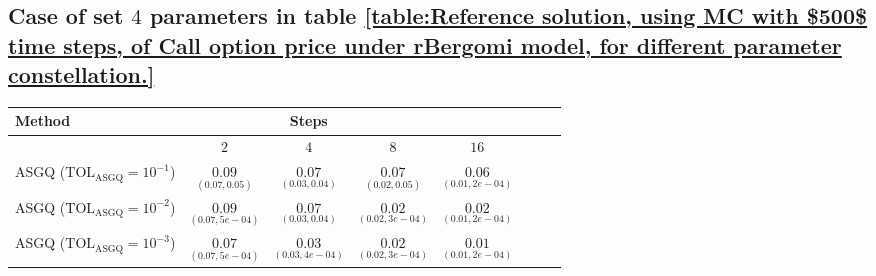 \subsection{Case of set $4$ parameters in table \ref{table:Reference solution, using MC with $500$ time steps, of Call option price under rBergomi model, for different parameter constellation.}}\label{appendix:Case of set 4 parameters}
\FloatBarrier
\begin{table}[h!]
	\begin{small}
		\centering
		\begin{tabular}{l*{6}{c}r}
			\toprule[1.5pt]
			Method & & Steps  & &     \\
			\hline	
			& $2$ & $4$ & $8$ & $16$  \\
			\hline
			
			ASGQ ($\text{TOL}_{\text{ASGQ}}=10^{-1}$)  & $\underset{(0.07,0.05)}{\mathbf{0.09}}$ & $\underset{(0.03,0.04)}{\mathbf{0.07}}$& $\underset{(0.02,0.05)}{\mathbf{ 0.07}}$ & $\underset{(0.01,2e-04)}{\mathbf{ 0.06}}$   \\
			
			ASGQ ($\text{TOL}_{\text{ASGQ}}=10^{-2}$)  &  $\underset{(0.07,5e-04)}{\mathbf{0.09}}$& $\underset{(0.03,0.04)}{\mathbf{0.07}}$& $\underset{(0.02,3e-04)}{\mathbf{ 0.02}}$ & $\underset{(0.01,2e-04)}{\mathbf{ 0.02}}$  \\
			ASGQ ($\text{TOL}_{\text{ASGQ}}=10^{-3}$)  &  $\underset{(0.07,5e-04)}{\mathbf{0.07}}$& $\underset{(0.03,4e-04)}{\mathbf{0.03}}$& $\underset{(0.02,3e-04)}{\mathbf{0.02}}$  & $\underset{(0.01,2e-04)}{\mathbf{ 0.01}}$  \\
			

\end{tabular}
\end{small}
\end{table}
